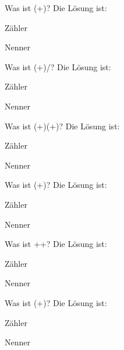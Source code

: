 \documentclass{ximera}
\begin{document}
\begin{shuffle}
\begin{question}
Was ist (+)\cdot{}?
Die Lösung ist:
\begin{solution}
Zähler 
\end{solution}
\begin{solution}
Nenner 
\end{solution}
\end{question}


\begin{question}
Was ist (+)/?
Die Lösung ist:
\begin{solution}
Zähler 
\end{solution}
\begin{solution}
Nenner 
\end{solution}
\end{question}


\begin{question}
Was ist (+)\cdot(+)?
Die Lösung ist:
\begin{solution}
Zähler 
\end{solution}
\begin{solution}
Nenner 
\end{solution}
\end{question}


\begin{question}
Was ist \cdot(+)?
Die Lösung ist:
\begin{solution}
Zähler 
\end{solution}
\begin{solution}
Nenner 
\end{solution}
\end{question}


\begin{question}
Was ist ++?
Die Lösung ist:
\begin{solution}
Zähler 
\end{solution}
\begin{solution}
Nenner 
\end{solution}
\end{question}


\begin{question}
Was ist (+)\cdot{}?
Die Lösung ist:
\begin{solution}
Zähler 
\end{solution}
\begin{solution}
Nenner 
\end{solution}
\end{question}



\end{shuffle}
\end{document}
